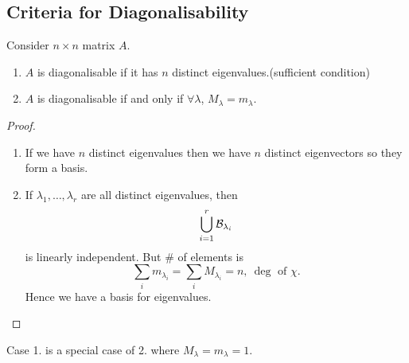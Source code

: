 \documentclass[10pt]{article}
\begin{document}
    \subsection{Criteria for Diagonalisability}
    \begin{proposition}
        Consider $n\times n$ matrix $A$.
        \begin{enumerate}
            \item $A$ is diagonalisable if it has $n$ distinct eigenvalues.(sufficient condition)
            \item $A$ is diagonalisable if and only if $ \forall \lambda $, $ M_\lambda=m_\lambda $.
        \end{enumerate}
    \end{proposition}
    \begin{proof}
        \begin{enumerate}
            \item If we have $n$ distinct eigenvalues then we have $n$ distinct eigenvectors so they form a basis.
            \item If $ \lambda_1,\dots,\lambda_r $ are all distinct eigenvalues, then 
            \[
                \bigcup_{i=1}^{r}{\mathcal{B}}_{\lambda_i}
            \]
            is linearly independent. But \# of elements is 
            \[
                \sum_i m_{\lambda_i}=\sum_i M_{\lambda_i}=n,\ \deg \text{ of } \chi
            .\]
            Hence we have a basis for eigenvalues.
        \end{enumerate}
    \end{proof}
    \begin{remark}
        Case 1. is a special case of 2. where $ M_\lambda=m_\lambda=1 $.
    \end{remark}
\end{document}
